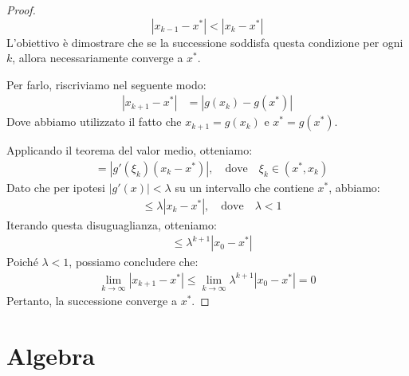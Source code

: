 \documentclass{article}
\begin{document}
\begin{proof}\leavevmode\
    $$\left\lvert x_{k-1}-x^*\right\rvert<\left\lvert x_k-x^*\right\rvert$$
    L'obiettivo è dimostrare che se la successione soddisfa questa
    condizione per ogni $k$, allora necessariamente converge a $x^*$.

    Per farlo, riscriviamo nel seguente modo:
    \[
    \begin{aligned}
        \left\lvert x_{k+1}-x^*\right\rvert &= \left\lvert g(x_k) - g(x^*) \right\rvert
    \end{aligned}
    \]
    Dove abbiamo utilizzato il fatto che $x_{k+1} = g(x_k)$ e $x^* = g(x^*)$.

    Applicando il teorema del valor medio, otteniamo:
    \[
    \begin{aligned}
        &= \left\lvert g'(\xi_k)(x_k-x^*) \right\rvert, \quad \text{dove} \quad \xi_k \in (x^*, x_k)
    \end{aligned}
    \]
    Dato che per ipotesi $|g'(x)| < \lambda$ su un intervallo che contiene
    $x^*$, abbiamo:
    \[
    \begin{aligned}
        &\leq \lambda \left\lvert x_k - x^* \right\rvert, \quad \text{dove} \quad \lambda < 1
    \end{aligned}
    \]
    Iterando questa disuguaglianza, otteniamo:
    \[
    \begin{aligned}
        &\leq \lambda^{k+1} \left\lvert x_0 - x^* \right\rvert
    \end{aligned}
    \]
    Poiché $\lambda < 1$, possiamo concludere che:
    \[
    \begin{aligned}
        \lim_{k \to \infty} \left\lvert x_{k+1} - x^* \right\rvert \leq \lim_{k \to \infty} \lambda^{k+1} \left\lvert x_0 - x^* \right\rvert = 0
    \end{aligned}
    \]
    Pertanto, la successione converge a $x^*$.
\end{proof}
\newpage
\section{Algebra}
\end{document}
